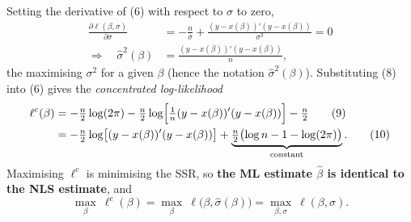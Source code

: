 \documentclass[11pt]{article}
\begin{document}
Setting the derivative of (6) with respect to $\sigma$ to zero,
\begin{align*}
 \frac{\partial\ell(\beta,\sigma)}{\partial\sigma}&=-\frac n\sigma+\frac{(y-x(\beta))'(y-x(\beta))}{\sigma^{3}}=0 \tag{7}\\
 \Longrightarrow\quad \hat\sigma^{2}(\beta)&=\frac{(y-x(\beta))'(y-x(\beta))}{n}, \tag{8}
\end{align*}
the maximising $\sigma^{2}$ for a given $\beta$ (hence the notation $\hat\sigma^{2}(\beta)$).
Substituting (8) into (6) gives the \emph{concentrated log-likelihood}
\begin{align*}
 \ell^{c}(\beta)&=-\tfrac n2\log(2\pi)-\tfrac n2\log\Bigl[\tfrac1n(y-x(\beta))'(y-x(\beta))\Bigr]-\tfrac n2 \tag{9}\\
 &=-\tfrac n2\log\bigl[(y-x(\beta))'(y-x(\beta))\bigr]
   +\underbrace{\tfrac n2\bigl(\log n-1-\log(2\pi)\bigr)}_{\text{constant}}. \tag{10}
\end{align*}
Maximising $\ell^{c}$ is minimising the SSR, so \textbf{the ML estimate $\hat\beta$ is identical to
the NLS estimate}, and
\begin{equation}\tag{11}
 \max_{\beta}\ \ell^{c}(\beta)=\max_{\beta}\ \ell\bigl(\beta,\hat\sigma(\beta)\bigr)=\max_{\beta,\sigma}\ \ell(\beta,\sigma).
\end{equation}
\end{document}
